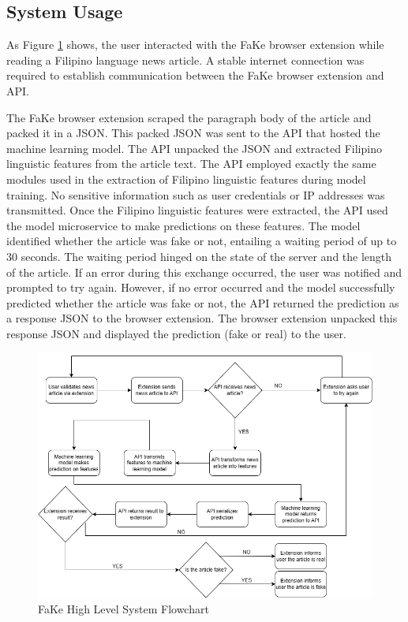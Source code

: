 \subsection{System Usage}

As Figure \ref{SystemFlowchart} shows, the user interacted with the FaKe browser extension while reading a Filipino language news article. A stable internet connection was required to establish communication between the FaKe browser extension and API.

The FaKe browser extension scraped the paragraph body of the article and packed it in a JSON. This packed JSON was sent to the API that hosted the machine learning model. The API unpacked the JSON and extracted Filipino linguistic features from the article text. The API employed exactly the same modules used in the extraction of Filipino linguistic features during model training. No sensitive information such as user credentials or IP addresses was transmitted. Once the Filipino linguistic features were extracted, the API used the model microservice to make predictions on these features. The model identified whether the article was fake or not, entailing a waiting period of up to 30 seconds. The waiting period hinged on the state of the server and the length of the article. If an error during this exchange occurred, the user was notified and prompted to try again. However, if no error occurred and the model successfully predicted whether the article was fake or not, the API returned the prediction as a response JSON to the browser extension. The browser extension unpacked this response JSON and displayed the prediction (fake or real) to the user.

\begin{figure}[h]
\includegraphics[width=\textwidth,height=\textheight,keepaspectratio]{figures/FakeSystemFlowchart.png}
  \caption{FaKe High Level System Flowchart}
  \label{SystemFlowchart}
\end{figure}
\clearpage

